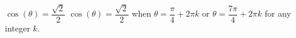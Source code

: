 {$\cos(\theta) = \dfrac{\sqrt{2}}{2}$}
{$\cos(\theta) = \dfrac{\sqrt{2}}{2}$ when $\theta = \dfrac{\pi}{4} + 2\pi k$ or $\theta = \dfrac{7\pi}{4} + 2\pi k$ for any integer $k$.}
